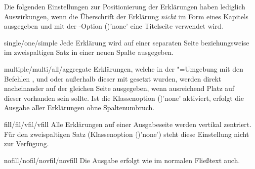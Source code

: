 \begin{Declaration*}{}
\begin{Declaration*}{}
\begin{Declaration*}{}
\begin{Declaration}
Die folgenden Einstellungen zur Positionierung der Erklärungen haben lediglich 
Auswirkungen, wenn die Überschrift der Erklärung \emph{nicht} im Form eines 
Kapitels ausgegeben und mit der \KOMAScript-Option 
()'none' eine Titelseite verwendet 
wird.
%
\begin{values}{}
\item[single/one/simple]
  Jede Erklärung wird auf einer separaten Seite
  beziehungsweise im zweispaltigen Satz in einer neuen Spalte ausgegeben.
\item[multiple/multi/all/aggregate]
  Erklärungen, welche in der "=Umgebung mit den 
  Befehlen ,  und  oder 
  außerhalb dieser mit  gesetzt wurden, werden direkt 
  nacheinander auf der gleichen Seite ausgegeben, wenn ausreichend Platz auf 
  dieser vorhanden sein sollte. Ist die Klassenoption 
  ()'none' aktiviert, erfolgt die Ausgabe 
  aller Erklärungen ohne Spaltenumbruch.
\item[fill/fil/vfil/vfill]
  Alle Erklärungen auf einer Ausgabeseite werden vertikal zentriert. Für 
  den zweispaltigen Satz 
  (Klassenoption ()'none') steht diese 
  Einstellung nicht zur Verfügung.
\item[nofill/nofil/novfil/novfill]
  Die Ausgabe erfolgt wie im normalen Fließtext auch.
\end{values}
\end{Declaration}


\end{Declaration*}
\end{Declaration*}
\end{Declaration*}
